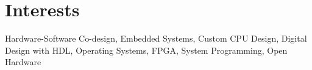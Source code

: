 \documentclass[letterpaper,11pt]{article}
\begin{document}
\section{Interests}
\begin{itemize}[leftmargin=0.15in, label={}]
  \small{\item{
    Hardware-Software Co-design, Embedded Systems, Custom CPU Design, Digital Design with HDL, Operating Systems, FPGA, System Programming, Open Hardware
  }}
\end{itemize}
\end{document}

